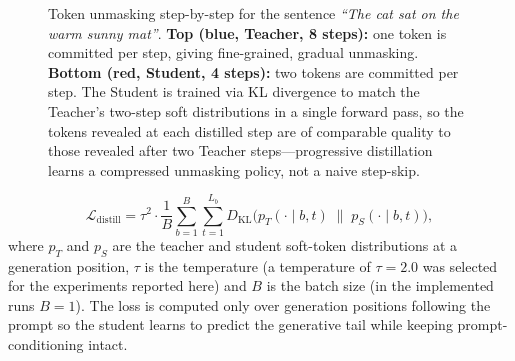 \documentclass[11pt, a4paper]{article}
\begin{document}
\begin{figure}[H]
\caption{Token unmasking step-by-step for the sentence \textit{``The cat sat on the warm sunny mat''}. \textbf{Top (blue, Teacher, 8 steps):} one token is committed per step, giving fine-grained, gradual unmasking. \textbf{Bottom (red, Student, 4 steps):} two tokens are committed per step. The Student is trained via KL divergence to match the Teacher's two-step soft distributions in a single forward pass, so the tokens revealed at each distilled step are of comparable quality to those revealed after two Teacher steps---progressive distillation learns a compressed unmasking policy, not a naive step-skip.}
\label{fig:token_unmasking}
\end{figure}

\begin{equation}
\mathcal{L}_{\mathrm{distill}} = \tau^2 \cdot \frac{1}{B} \sum_{b=1}^B \sum_{t=1}^{L_b}
D_{\mathrm{KL}}\big(p_T(\cdot\mid b,t)\;\|\;p_S(\cdot\mid b,t)\big),
\label{eq:distill_loss}
\end{equation}
where $p_T$ and $p_S$ are the teacher and student soft-token distributions at a
generation position, $\tau$ is the temperature (a temperature of $\tau=2.0$ was
selected for the experiments reported here) and $B$ is the batch size (in the
implemented runs $B=1$). The loss is computed only over generation positions
following the prompt so the student learns to predict the generative tail while
keeping prompt-conditioning intact.
\end{document}
